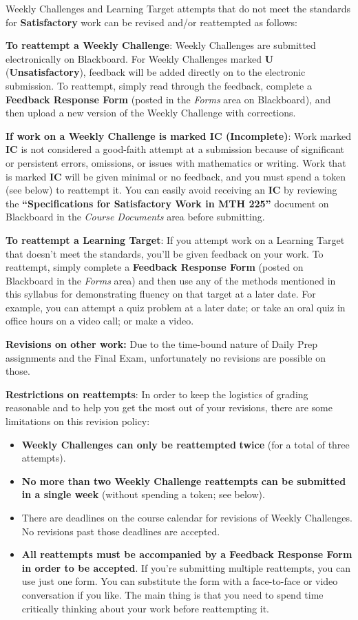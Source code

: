 \documentclass[]{article}
\providecommand{\tightlist}{%
  \setlength{\itemsep}{0pt}\setlength{\parskip}{0pt}}
\begin{document}
Weekly Challenges and Learning Target attempts that do not meet the standards for \textbf{Satisfactory} work can be revised and/or reattempted as follows: 

\textbf{To reattempt a Weekly Challenge}: Weekly Challenges are submitted electronically on Blackboard. For Weekly Challenges marked \textbf{U} (\textbf{Unsatisfactory}), feedback will be added directly on to the electronic submission. To reattempt, simply read through the feedback, complete a \textbf{Feedback Response Form} (posted in the \textit{Forms} area on Blackboard), and then upload a new version of the Weekly Challenge with corrections. 

\textbf{If work on a Weekly Challenge is marked IC (Incomplete)}: Work marked \textbf{IC} is not considered a good-faith attempt at a submission because of significant or persistent errors, omissions, or issues with mathematics or writing. Work that is marked \textbf{IC} will be given minimal or no feedback, and you must spend a token (see below) to reattempt it. You can easily avoid receiving an \textbf{IC} by reviewing the \textbf{``Specifications for Satisfactory Work in MTH 225''} document on Blackboard in the \textit{Course Documents} area before submitting. 

\textbf{To reattempt a Learning Target}: If you attempt work on a Learning Target that doesn't meet the standards, you'll be given feedback on your work. To reattempt, simply complete a \textbf{Feedback Response Form} (posted on Blackboard in the \textit{Forms} area) and then use any of the methods mentioned in this syllabus for demonstrating fluency on that target at a later date. For example, you can attempt a quiz problem at a later date; or take an oral quiz in office hours on a video call; or make a video. 

\textbf{Revisions on other work:} Due to the time-bound nature of Daily Prep assignments and the Final Exam, unfortunately no revisions are possible on those. 

\textbf{Restrictions on reattempts}: In order to keep the logistics of grading reasonable and to help you get the most out of your revisions, there are some limitations on this revision policy: 
\begin{itemize}
\tightlist
    \item \textbf{Weekly Challenges can only be reattempted }\textbf{twice} (for a total of three attempts). 
    \item \textbf{No more than two Weekly Challenge reattempts can be submitted in a single week} (without spending a token; see below).
    \item There are deadlines on the course calendar for revisions of Weekly Challenges. No revisions past those deadlines are accepted.  
    \item \textbf{All reattempts must be accompanied by a Feedback Response Form in order to be accepted}. If you're submitting multiple reattempts, you can use just one form. You can substitute the form with a face-to-face or video conversation if you like. The main thing is that you need to spend time critically thinking about your work before reattempting it. 
\end{itemize}
\end{document}
